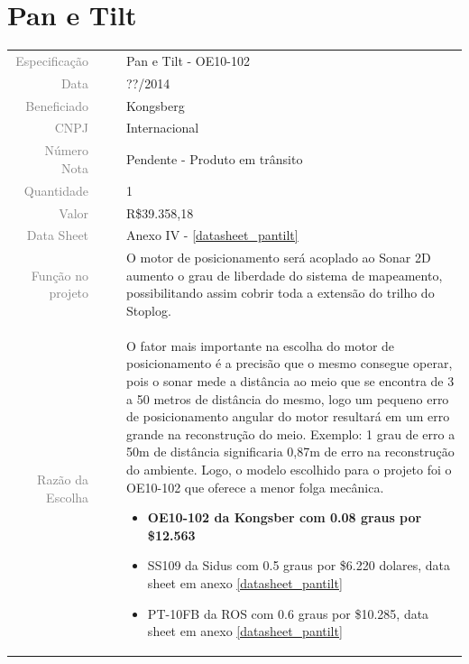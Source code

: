 

\section{Pan e Tilt}
\label{encoder}


\begin{table}[ht!]

	\begin{tabular}{r l|l p{12cm} }
		
		\textcolor{gray}{Especificação} &&& 	{Pan e Tilt - OE10-102}\\
		\textcolor{gray}{Data} &&& 				{??/2014}\\
        \textcolor{gray}{Beneficiado} &&&		{Kongsberg} \\
        \textcolor{gray}{CNPJ} &&& 				{Internacional} \\
        \textcolor{gray}{Número Nota} &&& 		{Pendente - Produto em trânsito} \\
		\textcolor{gray}{Quantidade} &&& 		{1} \\
		\textcolor{gray}{Valor} &&& 			{R\$39.358,18} \\
		\textcolor{gray}{Data Sheet} &&& 		{Anexo IV - \ref{datasheet_pantilt} } \\

		\textcolor{gray}{Função no projeto} &&& {O motor de posicionamento será acoplado ao Sonar 2D aumento o grau de liberdade do sistema de mapeamento, possibilitando assim cobrir toda a extensão do trilho do Stoplog.} \\
		\textcolor{gray}{Razão da Escolha} &&& {O fator mais importante na escolha do motor de posicionamento é a precisão que o mesmo consegue operar, pois o sonar mede a distância ao meio que se encontra de 3 a 50 metros de distância do mesmo, logo um pequeno erro de posicionamento angular do motor resultará em um erro grande na reconstrução do meio. Exemplo: 1 grau de erro a 50m de distância significaria 0,87m de erro na reconstrução do ambiente. Logo, o modelo escolhido para o projeto foi o OE10-102 que oferece a menor folga mecânica. 
		\begin{itemize}
		  \item \textbf{OE10-102 da Kongsber com 0.08 graus por \$12.563} 
		  \item SS109 da Sidus com 0.5 graus por \$6.220 dolares, data sheet em anexo \ref{datasheet_pantilt} 
		  \item PT-10FB da ROS com 0.6 graus por \$10.285, data sheet em anexo \ref{datasheet_pantilt} 
		\end{itemize}}
		

	\end{tabular}
\end{table}

